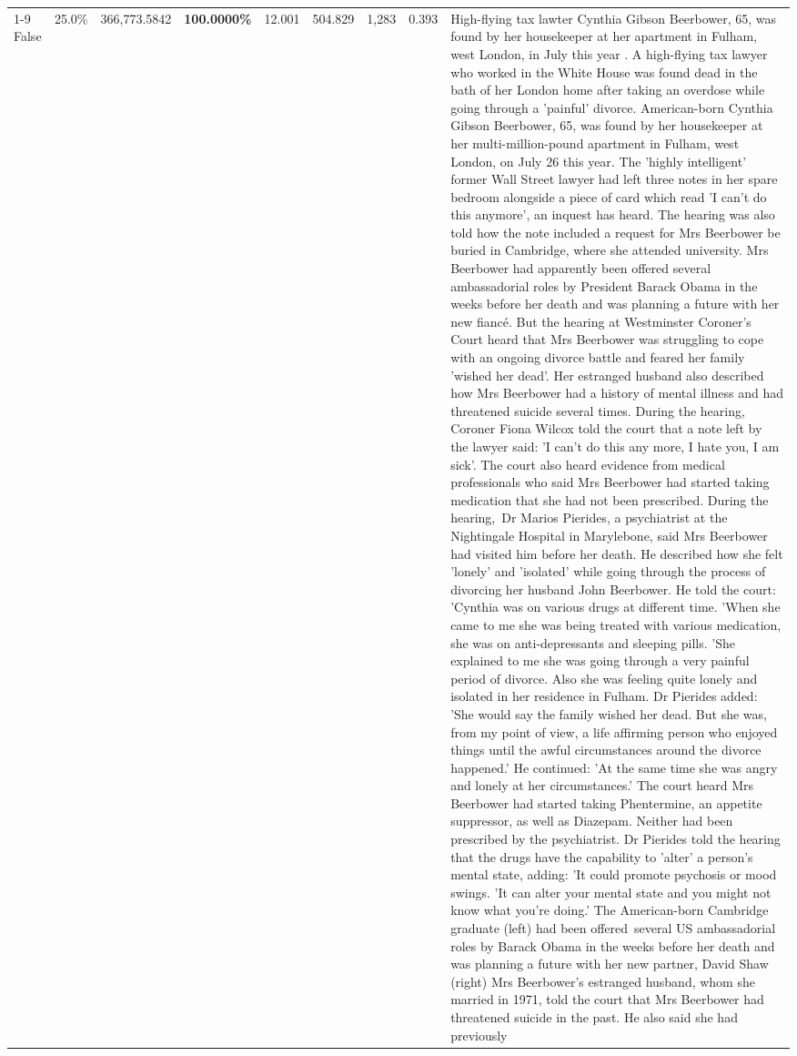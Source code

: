 \begin{table}[H]
\begin{tabular}{lllrlllll}
\cline{1-9}
False & 25.0\% & 366,773.5842 & \bfseries \color{red} 100.0000\% & 12.001 & 504.829 & 1,283 & 0.393 & High-flying tax lawter Cynthia Gibson Beerbower, 65, was found by her housekeeper at her apartment in Fulham, west London, in July this year . A high-flying tax lawyer who worked in the White House was found dead in the bath of her London home after taking an overdose while going through a 'painful' divorce. American-born Cynthia Gibson Beerbower, 65, was found by her housekeeper at her multi-million-pound apartment in Fulham, west London, on July 26 this year. The 'highly intelligent' former Wall Street lawyer had left three notes in her spare bedroom alongside a piece of card which read 'I can't do this anymore', an inquest has heard. The hearing was also told how the note included a request for Mrs Beerbower be buried in Cambridge, where she attended university. Mrs Beerbower had apparently been offered several ambassadorial roles by President Barack Obama in the weeks before her death and was planning a future with her new fiancé. But the hearing at Westminster Coroner's Court heard that Mrs Beerbower was struggling to cope with an ongoing divorce battle and feared her family 'wished her dead'. Her estranged husband also described how Mrs Beerbower had a history of mental illness and had threatened suicide several times. During the hearing, Coroner Fiona Wilcox told the court that a note left by the lawyer said: 'I can't do this any more, I hate you, I am sick'. The court also heard evidence from medical professionals who said Mrs Beerbower had started taking medication that she had not been prescribed. During the hearing, Dr Marios Pierides, a psychiatrist at the Nightingale Hospital in Marylebone, said Mrs Beerbower had visited him before her death. He described how she felt 'lonely' and 'isolated' while going through the process of divorcing her husband John Beerbower. He told the court: 'Cynthia was on various drugs at different time. 'When she came to me she was being treated with various medication, she was on anti-depressants and sleeping pills. 'She explained to me she was going through a very painful period of divorce. Also she was feeling quite lonely and isolated in her residence in Fulham. Dr Pierides added: 'She would say the family wished her dead. But she was, from my point of view, a life affirming person who enjoyed things until the awful circumstances around the divorce happened.' He continued: 'At the same time she was angry and lonely at her circumstances.' The court heard Mrs Beerbower had started taking Phentermine, an appetite suppressor, as well as Diazepam. Neither had been prescribed by the psychiatrist. Dr Pierides told the hearing that the drugs have the capability to 'alter' a person's mental state, adding: 'It could promote psychosis or mood swings. 'It can alter your mental state and you might not know what you're doing.' The American-born Cambridge graduate (left) had been offered several US ambassadorial roles by Barack Obama in the weeks before her death and was planning a future with her new partner, David Shaw (right) Mrs Beerbower's estranged husband, whom she married in 1971, told the court that Mrs Beerbower had threatened suicide in the past. He also said she had previously 
\end{tabular}
\end{table}
